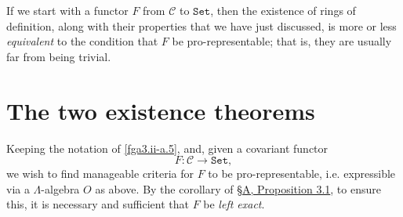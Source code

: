   If we start with a functor \(F\) from \(\mathcal {C}\) to \(\mathtt {Set}\), then the existence of rings of definition, along with their properties that we have just discussed, is more or less \emph{equivalent} to the condition that \(F\) be pro-representable;
  that is, they are usually far from being trivial.\chapter{The two existence theorems}\thispagestyle{fancy}\label{fga3.ii-b}\par{}Keeping the notation of \cref{fga3.ii-a.5}, and, given a covariant functor
  \[     F\colon  \mathcal {C} \to  \mathtt {Set},   \]
  we wish to find manageable criteria for \(F\) to be pro-representable, i.e. expressible via a \(\Lambda \)-algebra \(O\) as above.
  By the corollary of \hyperref[fga3.ii-a.3-proposition-3.1]{§A, Proposition 3.1}, to ensure this, it is necessary and sufficient that \(F\) be \emph{left exact}.
